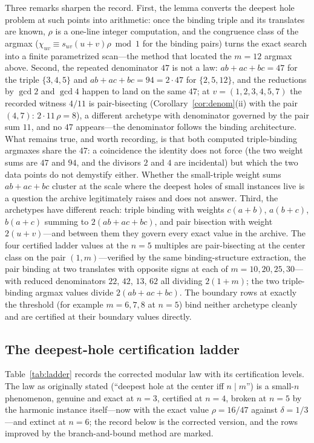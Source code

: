Three remarks sharpen the record. First, the lemma converts the deepest
hole problem at such points into arithmetic: once the binding triple
and its translates are known, $\rho$ is a one-line integer computation,
and the congruence class of the argmax
($\chi_{uv}\equiv s_{uv}(u{+}v)\rho \bmod 1$ for the binding pairs)
turns the exact search into a finite parametrized scan---the method
that located the $m=12$ argmax above. Second, the repeated denominator
$47$ is not a law: $ab+ac+bc=47$ for the triple $\{3,4,5\}$ and
$ab+ac+bc=94=2\cdot47$ for $\{2,5,12\}$, and the reductions by
$\gcd 2$ and $\gcd 4$ happen to land on the same $47$; at
$v=(1,2,3,4,5,7)$ the recorded witness $4/11$ is pair-bisecting
(Corollary~\ref{cor:denom}(ii) with the pair $(4,7)$:
$2\cdot11\,\rho=8$), a different archetype with denominator governed by
the pair sum $11$, and no $47$ appears---the denominator follows the
binding architecture. What remains true, and worth recording, is that
both computed triple-binding argmaxes share the $47$: a coincidence
the identity does not force (the two weight sums are $47$ and $94$, and
the divisors $2$ and $4$ are incidental) but which the two data points
do not demystify either. Whether the small-triple weight sums
$ab+ac+bc$ cluster at the scale where the deepest holes of small
instances live is a question the archive legitimately raises and does
not answer. Third, the
archetypes have different reach: triple binding with weights
$c(a{+}b)$, $a(b{+}c)$, $b(a{+}c)$ summing to $2(ab{+}ac{+}bc)$, and
pair bisection with weight $2(u{+}v)$---and between them they govern
every exact value in the archive. The four certified ladder values at
the $n=5$ multiples are pair-bisecting at the center class on the pair
$(1,m)$---verified by the same binding-structure extraction, the pair
binding at two translates with opposite signs at each of
$m=10,20,25,30$---with reduced denominators $22$, $42$, $13$, $62$ all
dividing $2(1{+}m)$; the two triple-binding argmax values divide
$2(ab{+}ac{+}bc)$. The boundary rows at exactly the
threshold (for example $m=6,7,8$ at $n=5$) bind neither archetype
cleanly and are certified at their boundary values directly.

\subsection{The deepest-hole certification ladder}

Table~\ref{tab:ladder} records the corrected modular law with its
certification levels. The law as originally stated (``deepest hole at
the center iff $n\mid m$'') is a small-$n$ phenomenon, genuine and exact
at $n=3$, certified at $n=4$, broken at $n=5$ by the harmonic instance
itself---now with the exact value $\rho=16/47$ against
$\delta=1/3$---and extinct at $n=6$; the record below is the corrected
version, and the rows improved by the branch-and-bound method are
marked.

